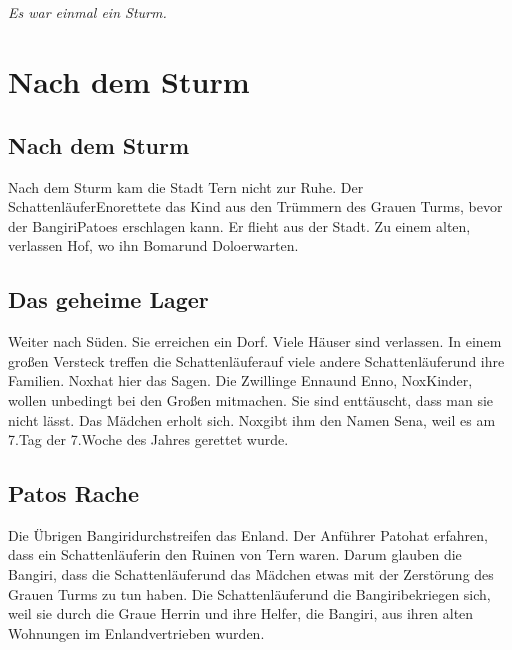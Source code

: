 \documentclass[12pt,a4paper,onecolumn,twoside,ngerman]{book}
\newcommand{\Tern}{Tern }
\newcommand{\Sena}{Sena}
\newcommand{\Bangiri}{Bangiri}
\newcommand{\Pato}{Pato}
\newcommand{\Enland}{Enland}
\newcommand{\Schattenlaufer}{Schattenläufer}
\newcommand{\Eno}{Eno}
\newcommand{\Bomar}{Bomar}
\newcommand{\Dolo}{Dolo}
\newcommand{\Nox}{Nox}
\newcommand{\Enna}{Enna}
\newcommand{\Enno}{Enno}
\begin{document}
  
  
  
  \tableofcontents
  


\paragraph{}
\textit{Es war einmal ein Sturm.}

\chapter{Nach dem Sturm}
\section{Nach dem Sturm}
Nach dem Sturm kam die Stadt \Tern nicht zur Ruhe.
Der \Schattenlaufer \Eno rettete das Kind aus den Trümmern des Grauen Turms, bevor der \Bangiri \Pato es erschlagen kann. Er flieht aus der Stadt. Zu einem alten, verlassen Hof, wo ihn \Bomar und \Dolo erwarten.

\section{Das geheime Lager}
Weiter nach Süden. Sie erreichen ein Dorf. Viele Häuser sind verlassen. In einem großen Versteck treffen die \Schattenlaufer auf viele andere \Schattenlaufer und ihre Familien. \Nox hat hier das Sagen. Die Zwillinge \Enna und \Enno , \Nox Kinder, wollen unbedingt bei den Großen mitmachen. Sie sind enttäuscht, dass man sie nicht lässt. Das Mädchen erholt sich. \Nox gibt ihm den Namen \Sena, weil es am 7.Tag der 7.Woche des Jahres gerettet wurde.

\section{\Pato{s} Rache}
Die Übrigen \Bangiri durchstreifen das \Enland . Der Anführer \Pato hat erfahren, dass ein \Schattenlaufer in den Ruinen von \Tern waren. Darum glauben die \Bangiri{,} dass die \Schattenlaufer und das Mädchen etwas mit der Zerstörung des Grauen Turms zu tun haben. Die \Schattenlaufer und die \Bangiri bekriegen sich, weil sie durch die Graue Herrin und ihre Helfer, die \Bangiri , aus ihren alten Wohnungen im \Enland vertrieben wurden. 
\end{document}
